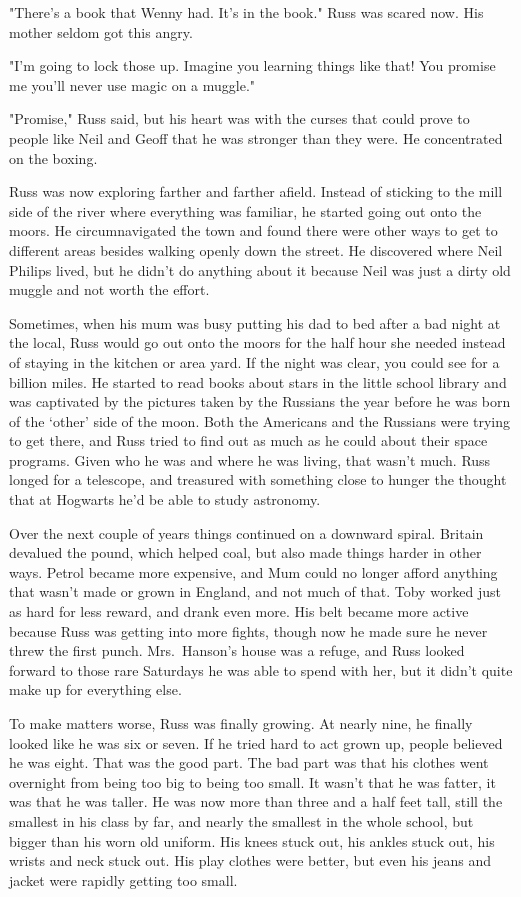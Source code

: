 "There's a book that Wenny had. It's in the book." Russ was scared now. His mother seldom got this angry.

"I'm going to lock those up. Imagine you learning things like that! You promise me you'll never use magic on a muggle."

"Promise," Russ said, but his heart was with the curses that could prove to people like Neil and Geoff that he was stronger than they were. He concentrated on the boxing.

Russ was now exploring farther and farther afield. Instead of sticking to the mill side of the river where everything was familiar, he started going out onto the moors. He circumnavigated the town and found there were other ways to get to different areas besides walking openly down the street. He discovered where Neil Philips lived, but he didn't do anything about it because Neil was just a dirty old muggle and not worth the effort.

Sometimes, when his mum was busy putting his dad to bed after a bad night at the local, Russ would go out onto the moors for the half hour she needed instead of staying in the kitchen or area yard. If the night was clear, you could see for a billion miles. He started to read books about stars in the little school library and was captivated by the pictures taken by the Russians the year before he was born of the `other' side of the moon. Both the Americans and the Russians were trying to get there, and Russ tried to find out as much as he could about their space programs. Given who he was and where he was living, that wasn't much. Russ longed for a telescope, and treasured with something close to hunger the thought that at Hogwarts he'd be able to study astronomy.

Over the next couple of years things continued on a downward spiral. Britain devalued the pound, which helped coal, but also made things harder in other ways. Petrol became more expensive, and Mum could no longer afford anything that wasn't made or grown in England, and not much of that. Toby worked just as hard for less reward, and drank even more. His belt became more active because Russ was getting into more fights, though now he made sure he never threw the first punch. Mrs.~Hanson's house was a refuge, and Russ looked forward to those rare Saturdays he was able to spend with her, but it didn't quite make up for everything else.

To make matters worse, Russ was finally growing. At nearly nine, he finally looked like he was six or seven. If he tried hard to act grown up, people believed he was eight. That was the good part. The bad part was that his clothes went overnight from being too big to being too small. It wasn't that he was fatter, it was that he was taller. He was now more than three and a half feet tall, still the smallest in his class by far, and nearly the smallest in the whole school, but bigger than his worn old uniform. His knees stuck out, his ankles stuck out, his wrists and neck stuck out. His play clothes were better, but even his jeans and jacket were rapidly getting too small.

